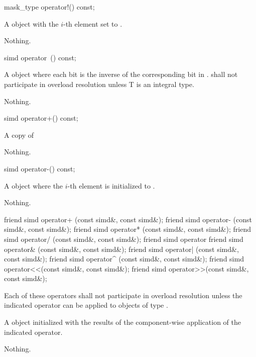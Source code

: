 \begin{itemdecl}
mask_type operator!() const;
\end{itemdecl}
\begin{itemdescr}
  \pnum\returns A \mask object with the $i$-th element set to  \foralli.

  \pnum\throws Nothing.
\end{itemdescr}

\begin{itemdecl}
simd operator~() const;
\end{itemdecl}
\begin{itemdescr}
  \pnum\returns A \simd object where each bit is the inverse of the corresponding bit in .
  \pnum\remarks \simd{} shall not participate in overload resolution unless \type T is an integral type.

  \pnum\throws Nothing.
\end{itemdescr}

\begin{itemdecl}
simd operator+() const;
\end{itemdecl}
\begin{itemdescr}
  \pnum \returns A copy of 

  \pnum\throws Nothing.
\end{itemdescr}

\begin{itemdecl}
simd operator-() const;
\end{itemdecl}
\begin{itemdescr}
  \pnum\returns A \simd object where the $i$-th element is initialized to  \foralli.

  \pnum\throws Nothing.
\end{itemdescr}


\begin{itemdecl}
friend simd operator+ (const simd&, const simd&);
friend simd operator- (const simd&, const simd&);
friend simd operator* (const simd&, const simd&);
friend simd operator/ (const simd&, const simd&);
friend simd operator%
friend simd operator& (const simd&, const simd&);
friend simd operator| (const simd&, const simd&);
friend simd operator^ (const simd&, const simd&);
friend simd operator<<(const simd&, const simd&);
friend simd operator>>(const simd&, const simd&);
\end{itemdecl}
\begin{itemdescr}
  \pnum\remarks Each of these operators shall not participate in overload resolution unless the indicated operator can be applied to objects of type .

  \pnum\returns A \simd object initialized with the results of the component-wise application of the indicated operator.

  \pnum\throws Nothing.
\end{itemdescr}

